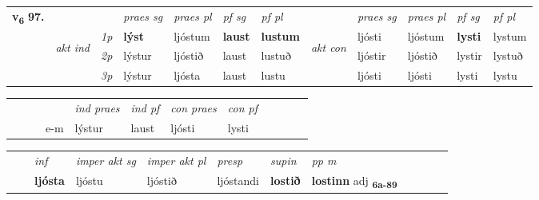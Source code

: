 \begin{tabular}{llllllllllll} \toprule
\multirow{4}{*}{{{\textbf{v{\textsubscript{6}}} \Large{\textbf{97.}}}}}  & &   &  \textit{praes sg}  & \textit{praes pl}  &\textit{ pf sg} & \textit{pf pl} &  &  \textit{praes sg}  & \textit{praes pl}  & \textit{pf sg} & \textit{pf pl } \\*
	\cmidrule{4-7} \cmidrule{9-12}
 & \multirow{3}{*}{\begin{turn}{90}\textit{akt ind}\end{turn}} & {\textit{1p}} & \textbf{lýst} & ljóstum    & \textbf{laust} & \textbf{lustum} & \multirow{3}{*}{\begin{turn}{90}\textit{akt con}\end{turn}} &ljósti & ljóstum & \textbf{lysti} & lystum\\*
& &  {\textit{2p}} &  lýstur  & ljóstið   & laust & lustuð & & ljóstir & ljóstið & lystir & lystuð \\*
& &  {\textit{3p}} & lýstur & ljósta   & laust & lustu & & ljósti & ljósti& lysti & lystu  \\*
\cmidrule{4-7} \cmidrule{9-12}
\end{tabular}


\begin{tabular}{llllllllllll}
 & &  & &  \textit{ind praes} & \textit{ind pf} & \textit{con praes} & \textit{con pf} \\*
&  & & e-m & lýstur & laust & ljósti & lysti \\*
\cmidrule{5-9}
\end{tabular}


\begin{tabular}{llllllllllll}
 & & \textit{inf} & \textit{imper akt sg} & \textit{imper akt pl}   & \textit{presp} & \textit{supin}  & \textit{pp m}     \\*
  & & \textbf{ljósta} & ljóstu  & ljóstið   & ljóstandi &  \textbf{lostið}  & \textbf{lostinn} adj \textbf{\textsubscript{6a-89}} \\*
\cmidrule{1-12}
\end{tabular}



